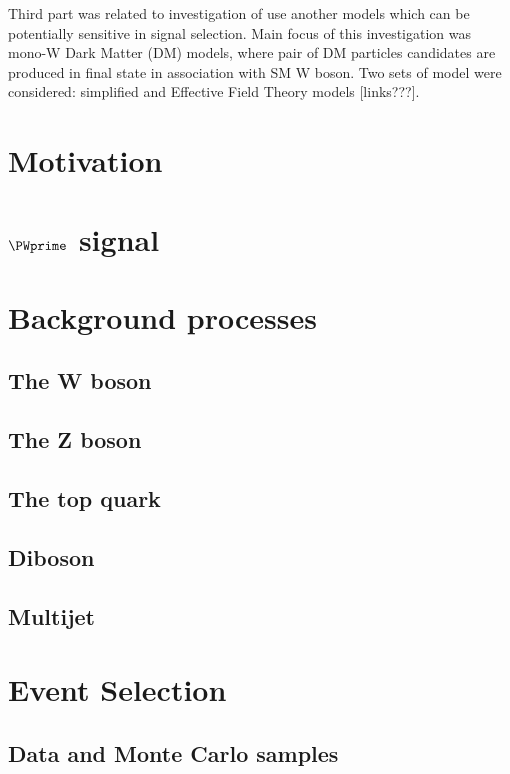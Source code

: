 Third part was related to investigation of use another models which can be potentially sensitive in signal selection.
Main focus of this investigation was mono-W Dark Matter (DM) models, where pair of DM particles candidates are produced in final state in association with SM W boson.
Two sets of model were considered: simplified and Effective Field Theory models [links???]. 


\section{Motivation}
\label{sec:wprimeIntro}

\section{$\PWprime$ signal}
\label{sec:wprimeSignal}

\section{Background processes}
\label{sec:wprimeBackgrounds}
\subsection{The W boson}
\subsection{The Z boson}
\subsection{The top quark}
\subsection{Diboson}
\subsection{Multijet}

\section{Event Selection}
\label{sec:wprimeEventSelection}
\subsection{Data and Monte Carlo samples}
